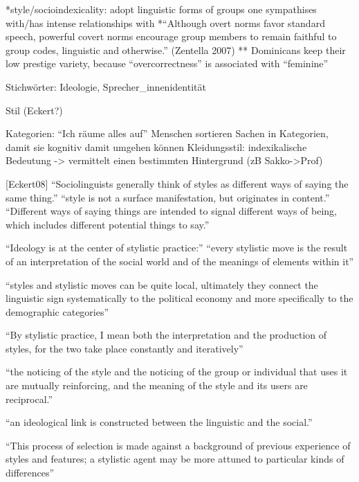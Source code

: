 
%
%



%
%

*style/socioindexicality: adopt linguistic forms of groups one sympathises with/has intense
relationships with
*``Although overt norms favor standard speech, powerful covert norms encourage
group members to remain faithful to group codes, linguistic and otherwise.'' (Zentella 2007)
** Dominicans keep their low prestige variety, because ``overcorrectness'' is associated with
``feminine''

Stichwörter:
Ideologie, Sprecher\_innenidentität

Stil (Eckert?)

Kategorien: ``Ich räume alles auf''
Menschen sortieren Sachen in Kategorien, damit sie kognitiv damit umgehen können
Kleidungsstil: indexikalische Bedeutung -> vermittelt einen bestimmten Hintergrund (zB Sakko->Prof)

[Eckert08]
``Sociolinguists generally think of styles as different ways of saying the same thing.''
``style is not a surface manifestation, but originates in content.''
``Different ways of saying things are intended to signal different ways of being,
which includes different potential things to say.''

``Ideology is at the center of stylistic practice:''
``every stylistic move is the result of an interpretation of the social
world and of the meanings of elements within it''

``styles and stylistic moves can be quite local, ultimately they connect the
linguistic sign systematically to the political economy and more specifically to
the demographic categories''

``By stylistic practice, I mean both the interpretation and the production of
styles, for the two take place constantly and iteratively''

``the noticing of the style and the noticing of the group or individual that
uses it are mutually reinforcing, and the meaning of the style and its users
are reciprocal.''

``an ideological link is constructed between the linguistic and the social.''

``This process of selection is made
against a background of previous experience of styles and features; a stylistic
agent may be more attuned to particular kinds of differences''

